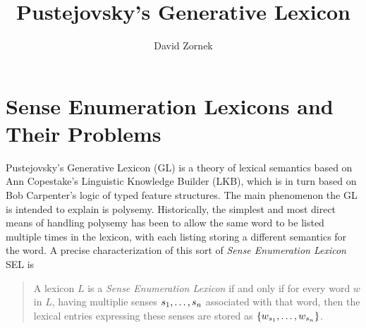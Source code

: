 \documentclass[12pt]{amsart}
\title{Pustejovsky's Generative Lexicon}
\author{David Zornek}
\date{} %
\begin{document}
\maketitle

\section{Sense Enumeration Lexicons and Their Problems}

Pustejovsky's Generative Lexicon (GL) is a theory of lexical semantics based on Ann Copestake's Linguistic Knowledge Builder (LKB), which is in turn based on Bob Carpenter's logic of typed feature structures. The main phenomenon the GL is intended to explain is polysemy. Historically, the simplest and most direct means of handling polysemy has been to allow the same word to be listed multiple times in the lexicon, with each listing storing a different semantics for the word. A precise characterization of this sort of \emph{Sense Enumeration Lexicon} SEL is
\begin{quote}
A lexicon $L$ is a \emph{Sense Enumeration Lexicon} if and only if for every word $w$ in $L$, having multiplie senses $s_1,\mathellipsis,s_n$ associated with that word, then the lexical entries expressing these senses are stored as $\{w_{s_1},\mathellipsis,w_{s_n}\}$. \cite[p. 34]{Pustejovsky95}
\end{quote}
\end{document}
